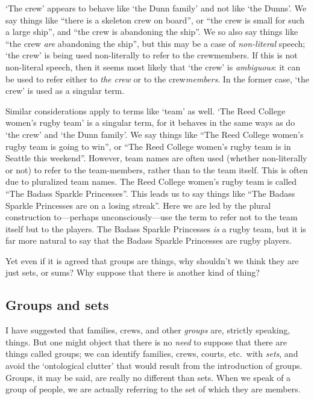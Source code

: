 \documentclass[11pt]{article}
\begin{document}
\begin{spacing}{1.5}
`The crew' appears to behave like `the Dunn family' and not like `the
Dunns'.  We say things like ``there is a skeleton crew on board'', or
``the crew is small for such a large ship'', and ``the crew is
abandoning the ship''.  We so also say things like ``the crew {\em
  are} abandoning the ship'', but this may be a case of {\em
  non-literal} speech; `the crew' is being used non-literally to refer
to the crewmembers.  If this is not non-literal speech, then it seems
most likely that `the crew' is {\em ambiguous}: it can be used to
refer either to {\em the crew} or to the crew{\em members}.  In the
former case, `the crew' is used as a singular term.

Similar considerations apply to terms like `team' as well.  `The Reed
College women's rugby team' is a singular term, for it behaves in the
same ways as do `the crew' and `the Dunn family'.  We say things like
``The Reed College women's rugby team is going to win'', or ``The Reed
College women's rugby team is in Seattle this weekend''.  However,
team names are often used (whether non-literally or not) to refer to
the team-members, rather than to the team itself.  This is often due to
pluralized team names.  The Reed College women's rugby team is called
``The Badass Sparkle Princesses''.  This leads us to say things like
``The Badass Sparkle Princesses are on a losing streak''.  Here we are
led by the plural construction to---perhaps unconsciously---use the
term to refer not to the team itself but to the players.  The Badass
Sparkle Princesses {\em is} a rugby team, but it is far more natural
to say that the Badass Sparkle Princesses are rugby players.

Yet even if it is agreed that groups are things, why shouldn't we
think they are just sets, or sums?  Why suppose that there is another
kind of thing?

\subsection{Groups and sets}
\label{group-set}
I have suggested that families, crews, and other {\em groups} are,
strictly speaking, things.  But one might object that there is no {\em
  need} to suppose that there are things called groups; we can
identify families, crews, courts, etc.\ with {\em sets}, and avoid the
`ontological clutter' that would result from the introduction of
groups.  Groups, it may be said, are really no different than sets.
When we speak of a group of people, we are actually referring to the
set of which they are members.


\end{spacing}
\end{document}

